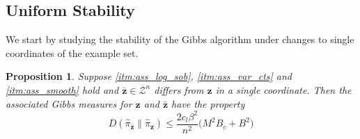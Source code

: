 \documentclass{article}
\newtheorem{proposition}[theorem]{Proposition}
\newcommand{\Bbf}[1]{\mathbf{#1}}
\newcommand{\Bcal}[1]{\mathcal{#1}}
\begin{document}
\subsection{Uniform Stability}
We start by studying the stability of the Gibbs algorithm under changes to single coordinates of the example set.

\begin{proposition}\label{prop:gibbs_wass_stable}
Suppose \ref{itm:ass_log_sob}, \ref{itm:ass_var_cts} and \ref{itm:ass_smooth} hold and \(\bar{\Bbf{z}} \in \Bcal{Z}^n\) differs from \(\Bbf{z}\) in a single coordinate. Then the associated Gibbs measures for \(\Bbf{z}\) and \(\bar{\Bbf{z}}\) have the property
\begin{equation*}
    D(\hat{\pi}_{\bar{\Bbf{z}}} \| \hat{\pi}_{\Bbf{z}}) \leq \frac{2 c_l \beta^2}{n^2} \big ( M^2 B_c + B^2 \big )
\end{equation*}
\end{proposition}
\end{document}
